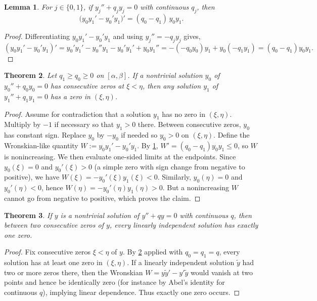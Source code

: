 \documentclass[a4paper, reqno]{amsart}
\numberwithin{equation}{section}
\theoremstyle{plain}
\newtheorem{theorem}{Theorem}[section]
\newtheorem{lemma}[theorem]{Lemma}
\theoremstyle{definition}
\theoremstyle{remark}
\begin{document}
\begin{lemma}\label{lem:lagrange}
For $j \in\{0,1\}$, if $y_j''+q_j y_j=0$ with continuous $q_j$, then
$$\big(y_0 y_1'-y_0' y_1\big)'=(q_0-q_1)\,y_0 y_1.$$
\end{lemma}
\begin{proof}
Differentiating $y_0 y_1'-y_0' y_1$ and using $y_j''=-q_j y_j$ gives,
$$(y_0 y_1'-y_0' y_1)'=y_0' y_1'-y_0'' y_1 - y_0' y_1'+y_0 y_1'' = -(-q_0 y_0)y_1 + y_0(-q_1 y_1) = (q_0-q_1)y_0 y_1.$$

\end{proof}

\begin{theorem}\label{thm:sturm}
Let $q_1\ge q_0\ge 0$ on $[\alpha,\beta]$. If a nontrivial solution $y_0$ of $y_0''+q_0 y_0=0$ has consecutive zeros at $\xi<\eta$, then any solution $y_1$ of $y_1''+q_1 y_1=0$ has a zero in $(\xi,\eta)$.
\end{theorem}
\begin{proof}
Assume for contradiction that a solution $y_1$ has no zero in $(\xi,\eta)$. Multiply by $-1$ if necessary so that $y_1>0$ there. Between consecutive zeros, $y_0$ has constant sign. Replace $y_0$ by $-y_0$ if needed so $y_0>0$ on $(\xi,\eta)$. Define the Wronskian-like quantity $W:=y_0 y_1'-y_0' y_1$. By \cref{lem:lagrange}, $W'=(q_0-q_1)y_0 y_1\le 0$, so $W$ is nonincreasing. We then evaluate one-sided limits at the endpoints. Since $y_0(\xi)=0$ and $y_0'(\xi)>0$ (a simple zero with sign change from negative to positive), we have $W(\xi)=-y_0'(\xi)y_1(\xi)<0$. Similarly, $y_0(\eta)=0$ and $y_0'(\eta)<0$, hence $W(\eta)=-y_0'(\eta)y_1(\eta)>0$. But a nonincreasing $W$ cannot go from negative to positive, which proves the claim.

\end{proof}

\begin{theorem}\label{thm:separation}
If $y$ is a nontrivial solution of $y''+q y=0$ with continuous $q$, then between two consecutive zeros of $y$, every linearly independent solution has exactly one zero.
\end{theorem}
\begin{proof}
Fix consecutive zeros $\xi<\eta$ of $y$. By \cref{thm:sturm} applied with $q_0=q_1=q$, every solution has at least one zero in $(\xi,\eta)$. If a linearly independent solution $\tilde y$ had two or more zeros there, then the Wronskian $W=y\tilde y'-y'\tilde y$ would vanish at two points and hence be identically zero (for instance by Abel’s identity for continuous $q$), implying linear dependence. Thus exactly one zero occurs.

\end{proof}
\end{document}
